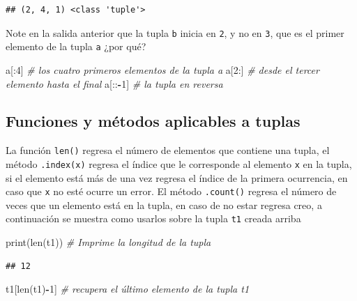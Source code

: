 \documentclass[
]{book}
\newenvironment{Shaded}{\begin{snugshade}}{\end{snugshade}}
\newcommand{\BuiltInTok}[1]{#1}
\newcommand{\CommentTok}[1]{\textcolor[rgb]{0.56,0.35,0.01}{\textit{#1}}}
\newcommand{\DecValTok}[1]{\textcolor[rgb]{0.00,0.00,0.81}{#1}}
\newcommand{\NormalTok}[1]{#1}
\newcommand{\OperatorTok}[1]{\textcolor[rgb]{0.81,0.36,0.00}{\textbf{#1}}}
\theoremstyle{definition}
\theoremstyle{definition}
\theoremstyle{definition}
\theoremstyle{definition}
\theoremstyle{remark}
\begin{document}
\begin{verbatim}
## (2, 4, 1) <class 'tuple'>
\end{verbatim}

Note en la salida anterior que la tupla \texttt{b} inicia en \texttt{2}, y no en \texttt{3}, que es el primer elemento de la tupla \texttt{a} ¿por qué?

\begin{Shaded}
\begin{Highlighting}[]
\NormalTok{a[:}\DecValTok{4}\NormalTok{]    }\CommentTok{\# los cuatro primeros elementos de la tupla a}
\NormalTok{a[}\DecValTok{2}\NormalTok{:]    }\CommentTok{\# desde el tercer elemento hasta el final }
\NormalTok{a[::}\OperatorTok{{-}}\DecValTok{1}\NormalTok{]  }\CommentTok{\# la tupla en reversa  }
\end{Highlighting}
\end{Shaded}

\hypertarget{sec:funcionesAplicablesATuplas}{%
\subsection{Funciones y métodos aplicables a tuplas}\label{sec:funcionesAplicablesATuplas}}

La función \texttt{len()} regresa el número de elementos que contiene una tupla, el método \texttt{.index(x)} regresa el índice que le corresponde al elemento \texttt{x} en la tupla, si el elemento está más de una vez regresa el índice de la primera ocurrencia, en caso que \texttt{x} no esté ocurre un error. El método \texttt{.count()} regresa el número de veces que un elemento está en la tupla, en caso de no estar regresa creo, a continuación se muestra como usarlos sobre la tupla \texttt{t1} creada arriba

\begin{Shaded}
\begin{Highlighting}[]
\BuiltInTok{print}\NormalTok{(}\BuiltInTok{len}\NormalTok{(t1)) }\CommentTok{\# Imprime  la longitud  de la tupla}
\end{Highlighting}
\end{Shaded}

\begin{verbatim}
## 12
\end{verbatim}

\begin{Shaded}
\begin{Highlighting}[]
\NormalTok{t1[}\BuiltInTok{len}\NormalTok{(t1)}\OperatorTok{{-}}\DecValTok{1}\NormalTok{]  }\CommentTok{\# recupera el último elemento de la tupla t1}
\end{Highlighting}
\end{Shaded}
\end{document}
